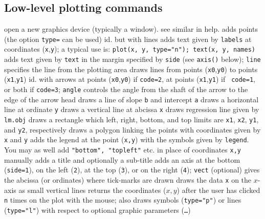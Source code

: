\subsection{Low-level plotting commands}{}
	{open a new graphics device (typically a window). see similar in help.}
	{adds points (the option {\tt type=} can be used)}
	{ id. but with lines}
	{ adds text given by {\tt labels} at
coordinates ({\tt x},{\tt y}); a typical use is: {\tt plot(x, y, type="n");
text(x, y, names)}}
	{adds text given by {\tt text} in
the margin specified by {\tt side} (see {\tt axis()} below); {\tt line}
specifies the line from the plotting area}
	{ draws lines from points ({\tt x0},{\tt y0})
to points ({\tt x1},{\tt y1})}
	{id. with arrows at points
({\tt x0},{\tt y0}) if {\tt code=2}, at points ({\tt x1},{\tt y1}) if {\tt
code=1}, or both if {\tt code=3}; {\tt angle} controls the angle from the shaft
of the arrow to the edge of the arrow head}
	{draws a line of slope {\tt b} and intercept {\tt a}}
	{ draws a horizontal line at ordinate {\tt y}}
	{ draws a vertical line at abcissa {\tt x}}
	{ draws regression line given by {\tt lm.obj}}
	{ draws a rectangle which left, right, bottom, and
top limits are {\tt x1}, {\tt x2}, {\tt y1}, and {\tt y2}, respectively}
	{draws a polygon linking the points with coordinates
given by {\tt x} and {\tt y}}
	{ adds the legend at the point ({\tt x,y})
with the symbols given by {\tt legend}. You may as well add {\tt "bottom",
"topleft"} etc. in place of coordinates {\tt x,y} manually}
	{ adds a title and optionally a sub-title}
	{adds an axis at the bottom ({\tt side=1}), on the left
({\tt 2}), at the top ({\tt 3}), or on the right ({\tt 4}); {\tt vect}
(optional) gives the abcissa (or ordinates) where tick-marks are drawn}
	{draws the data {\tt x} on the $x$-axis as small vertical lines}
	{returns the coordinates ($x,y$) after the
user has clicked {\tt n} times on the plot with the mouse; also draws
symbols ({\tt type="p"}) or lines ({\tt type="l"}) with respect to optional
graphic parameters ({\tt \ldots})}

